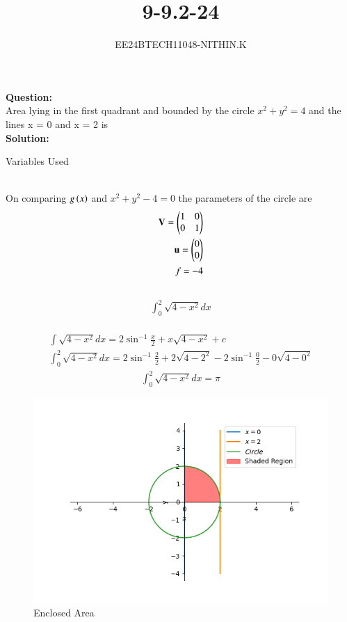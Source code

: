 \documentclass[journal]{IEEEtran}
\begin{document}


\title{9-9.2-24}
\author{EE24BTECH11048-NITHIN.K}
{\let\newpage\relax\maketitle}

\textbf{Question:} \\
Area lying in the first quadrant and bounded by the circle $x^2 + y^2 = 4$ and the lines
x = 0 and x = 2 is \\
\textbf{Solution:} \\
\begin{table}[h!]
	\centering
	\resizebox{\textwidth}{!}{
		
	}
	\caption{Variables Used}
\end{table}\\
On comparing $g\left(x\right)$ and $x^2 + y^2 - 4 = 0$ the parameters of the circle are \\
\begin{align}
	\mathbf{V} = \begin{pmatrix} 1 & 0 \\
	0 & 1 \end{pmatrix} \\
	\mathbf{u} = \begin{pmatrix}0 \\
	0 \end{pmatrix} \\
	f = -4 \\
\end{align}
 \\
\begin{align}
	\int_{0}^{2}\sqrt{4 - x^2} dx
\end{align}
 \\
\begin{align}
	\int\sqrt{4 - x^2} dx = 2\sin^{-1}\frac{x}{2} + x\sqrt{4 - x^2} + c \\
	\int_{0}^{2}\sqrt{4 - x^2} dx = 2\sin^{-1}\frac{2}{2} + 2\sqrt{4 - 2^2} - 2\sin^{-1}\frac{0}{2} - 0\sqrt{4 - 0^2}
\end{align}
\begin{align}
	\int_{0}^{2}\sqrt{4 - x^2} dx = \pi
\end{align}
\begin{figure}[h]
\centering
\includegraphics[width=0.7\linewidth]{figs/Figure_1.png}
\caption{Enclosed Area}
\end{figure}
\end{document}
